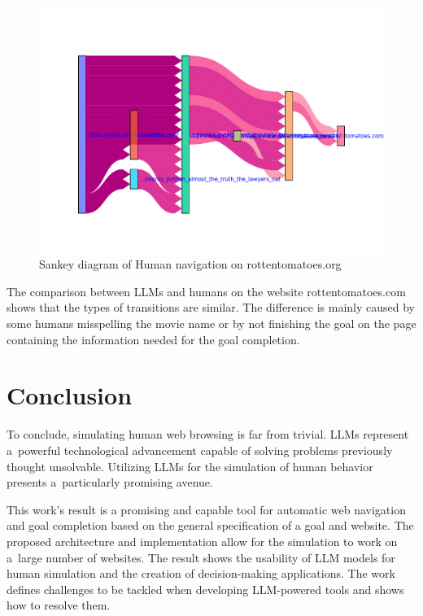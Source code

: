 \begin{figure}[H]
    \centering
    \includegraphics[width=\textwidth]{obrazky-figures/sankey_rotten_tomatoes_human.pdf}
    \caption{Sankey diagram of Human navigation on rottentomatoes.org}
    \label{sankey_tomatoes_human}
\end{figure}

The comparison between LLMs and humans on the website rottentomatoes.com shows that the types of transitions are similar. The difference is mainly caused by some humans misspelling the movie name or by not finishing the goal on the page containing the information needed for the goal completion. 

\chapter{Conclusion}
\label{con}


To conclude, simulating human web browsing is far from trivial. LLMs represent a~powerful technological advancement capable of solving problems previously thought unsolvable. Utilizing LLMs for the simulation of human behavior presents a~particularly promising avenue.

This work's result is a promising and capable tool for automatic web navigation and goal completion based on the general specification of a goal and website. The proposed architecture and implementation allow for the simulation to work on a~large number of websites. The result shows the usability of LLM models for human simulation and the creation of decision-making applications. The work defines challenges to be tackled when developing LLM-powered tools and shows how to resolve them. 

